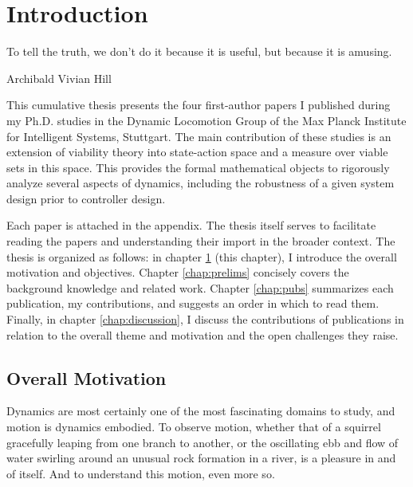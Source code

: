 
\chapter{Introduction} \label{chap:intro}
\epigraph{To tell the truth, we don't do it because it is useful, but because it is amusing.}{Archibald Vivian Hill}

This cumulative thesis presents the four first-author papers I published during my Ph.D. studies in the Dynamic Locomotion Group of the Max Planck Institute for Intelligent Systems, Stuttgart. The main contribution of these studies is an extension of viability theory into state-action space and a measure over viable sets in this space. This provides the formal mathematical objects to rigorously analyze several aspects of dynamics, including the robustness of a given system design prior to controller design. \par
Each paper is attached in the appendix. The thesis itself serves to facilitate reading the papers and understanding their import in the broader context. The thesis is organized as follows: in chapter \ref{chap:intro} (this chapter), I introduce the overall motivation and objectives.
Chapter \ref{chap:prelims} concisely covers the background knowledge and related work.
Chapter \ref{chap:pubs} summarizes each publication, my contributions, and suggests an order in which to read them.
Finally, in chapter \ref{chap:discussion}, I discuss the contributions of publications in relation to the overall theme and motivation and the open challenges they raise.

\section{Overall Motivation}

Dynamics are most certainly one of the most fascinating domains to study, and motion is dynamics embodied. To observe motion, whether that of a squirrel gracefully leaping from one branch to another, or the oscillating ebb and flow of water swirling around an unusual rock formation in a river, is a pleasure in and of itself. And to understand this motion, even more so. \par

